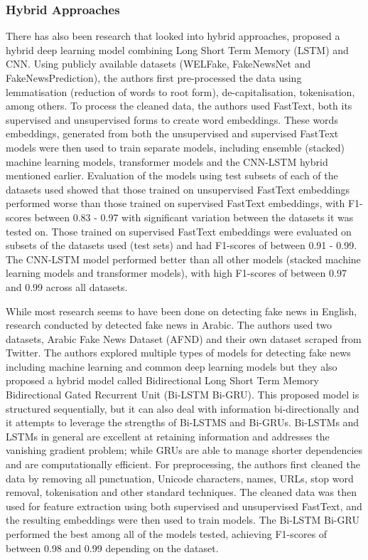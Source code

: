 \documentclass[stu,12pt,floatsintext,donotrepeattitle]{apa7}
\begin{document}
\subsubsection{Hybrid Approaches}
There has also been research that looked into hybrid approaches, \textcite{hybrid_cnn-lstm} proposed a hybrid deep learning model combining Long Short Term Memory (LSTM) and CNN. Using publicly available datasets (WELFake, FakeNewsNet and FakeNewsPrediction), the authors first pre-processed the data using lemmatisation (reduction of words to root form), de-capitalisation, tokenisation, among others. To process the cleaned data, the authors used FastText, both its supervised and unsupervised forms to create word embeddings. These words embeddings, generated from both the unsupervised and supervised FastText models were then used to train separate models, including ensemble (stacked) machine learning models, transformer models and the CNN-LSTM hybrid mentioned earlier. Evaluation of the models using test subsets of each of the datasets used showed that those trained on unsupervised FastText embeddings performed worse than those trained on supervised FastText embeddings, with F1-scores between 0.83 - 0.97 with significant variation between the datasets it was tested on. Those trained on supervised FastText embeddings were evaluated on subsets of the datasets used (test sets) and had F1-scores of between 0.91 - 0.99. The CNN-LSTM model performed better than all other models (stacked machine learning models and transformer models), with high F1-scores of between 0.97 and 0.99 across all datasets.

While most research seems to have been done on detecting fake news in English, research conducted by \textcite{hybrid2} detected fake news in Arabic. The authors used two datasets, Arabic Fake News Dataset (AFND) and their own dataset scraped from Twitter. The authors explored multiple types of models for detecting fake news including machine learning and common deep learning models but they also proposed a hybrid model called Bidirectional Long Short Term Memory \textendash{} Bidirectional Gated Recurrent Unit (Bi-LSTM \textendash{} Bi-GRU). This proposed model is structured sequentially, but it can also deal with information bi-directionally and it attempts to leverage the strengths of Bi-LSTMS and Bi-GRUs. Bi-LSTMs and LSTMs in general are excellent at retaining information and addresses the vanishing gradient problem; while GRUs are able to manage shorter dependencies and are computationally efficient. For preprocessing, the authors first cleaned the data by removing all punctuation, Unicode characters, names, URLs, stop word removal, tokenisation and other standard techniques. The cleaned data was then used for feature extraction using both supervised and unsupervised FastText, and the resulting embeddings were then used to train models. The Bi-LSTM \textendash{} Bi-GRU performed the best among all of the models tested, achieving F1-scores of between 0.98 and 0.99 depending on the dataset. 
\end{document}
